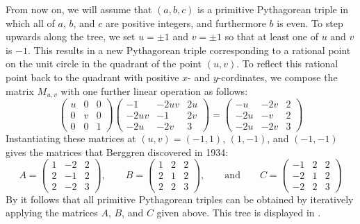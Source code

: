 \begin{example}
From now on, we will assume that $(a,b,c)$ is a primitive Pythagorean triple in which all of $a$, $b$, and $c$ are positive integers, and furthermore $b$ is even. To step upwards along the tree, we set $u=\pm 1$ and $v=\pm 1$ so that at least one of $u$ and $v$ is $-1$. This results in a new Pythagorean triple corresponding to a rational point on the unit circle in the quadrant of the point $(u,v)$. To reflect this rational point back to the quadrant with positive $x$- and $y$-cordinates, we compose the matrix $M_{u,v}$ with one further linear operation as follows:
\begin{equation*}
  \begin{pmatrix}
    u & 0 & 0 \\
    0 & v & 0 \\
    0 & 0 & 1
  \end{pmatrix}
  \begin{pmatrix}
    -1 & -2uv & 2u \\
    -2uv & -1 & 2v \\
    -2u & -2v & 3
  \end{pmatrix}
  =
  \begin{pmatrix}
    -u & -2v & 2 \\
    -2u & -v & 2 \\
    -2u & -2v & 3
  \end{pmatrix}
\end{equation*}
Instantiating these matrices at $(u,v)=(-1,1)$, $(1,-1)$, and $(-1,-1)$ gives the matrices that Berggren discovered in 1934:
\begin{equation*}
  A =
  \left(
    \begin{matrix}
      1 & -2 & 2 \\
      2 & -1 & 2 \\
      2 & -2 & 3
    \end{matrix}
  \right),\qquad
  B =
  \left(
    \begin{matrix}
      1 & 2 & 2 \\
      2 & 1 & 2 \\
      2 & 2 & 3
    \end{matrix}
  \right),\qquad\text{and}\qquad
  C =
  \left(
    \begin{matrix}
      -1 & 2 & 2 \\
      -2 & 1 & 2 \\
      -2 & 2 & 3
    \end{matrix}
  \right)
\end{equation*}
By  it follows that all primitive Pythagorean triples can be obtained by iteratively applying the matrices $A$, $B$, and $C$ given above. This tree is displayed in .
\end{example}

